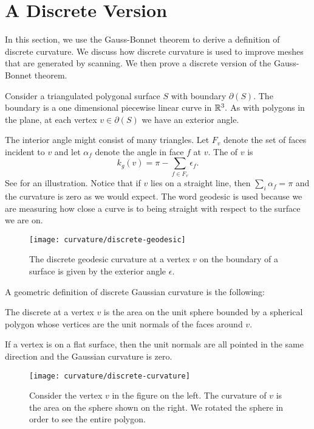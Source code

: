 \section{A Discrete Version}
\label{sec:discrete}

In this section, we use the Gauss-Bonnet theorem to derive
a definition of discrete curvature. We discuss how discrete curvature
is used to improve meshes that are generated by scanning.
We then prove a discrete version of the Gauss-Bonnet theorem.

Consider a triangulated polygonal surface $S$ with boundary $\partial(S)$.
The boundary is a one dimensional piecewise linear curve in $\mathbb{R}^3.$
As with polygons in the plane, at each vertex $v\in \partial(S)$ 
we have an exterior angle.

The interior angle might consist of many triangles.
Let $F_v$  denote the set of faces incident to $v$ and let
$\alpha_f$ denote the angle in face $f$ at $v$.
The 
of $v$  is
$$k_{g}(v)= \pi-\sum_{f\in F_v}\epsilon_f.$$
See  for an illustration.
Notice that if $v$ lies on a straight line, then $\sum_{i}\alpha_f=\pi$
and the curvature is zero as we would expect.
The word geodesic is used because we are measuring how close
a curve is to being straight with respect to the surface we are on.


\begin{figure}[htb]
\centering
	\texttt{[image: curvature/discrete-geodesic]}
	\caption{The discrete geodesic curvature at a vertex $v$ on the boundary
	of a surface is given by the exterior angle $\epsilon$.}
	\label{fig:discrete-geodesic}
\end{figure}



A geometric definition of discrete Gaussian curvature is the following:
\begin{definition}\label{def:discrete-curvature-vertex}

The discrete  at a vertex $v$ is the area on the unit 
sphere bounded by a spherical polygon whose vertices are the unit normals of 
the faces around $v$.

\end{definition}

If a vertex is on a flat surface, then the unit normals are all pointed
in the same direction and the Gaussian curvature is zero.

\begin{figure}[htb]
\centering
\texttt{[image: curvature/discrete-curvature]}
\caption{Consider the vertex $v$ in the figure on the left. The curvature of $v$
is the area on the sphere shown on the right. We rotated the sphere
in order to see the entire polygon.}
\label{fig:discrete-curvature}
\end{figure}


